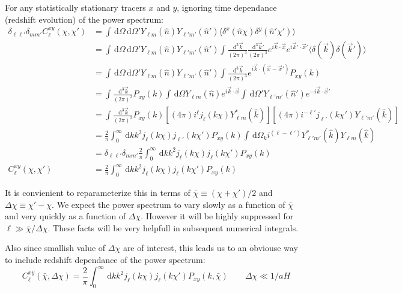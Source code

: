 \documentclass[twocolumn,prl,nofootinbib]{revtex4-1}
\newcommand{\ud}{\,\mathrm{d}}
\begin{document}
\begin{widetext}
For any statistically stationary tracers $x$ and $y$,
ignoring time dependance (redshift evolution)
of the power spectrum:
\begin{align}
    \delta_{\ell\ell'}\delta_{mm'}C^{xy}_\ell(\chi, \chi')
    &= \int\ud\Omega\ud\Omega'Y_{\ell m}(\hat n) Y_{\ell' m'}(\hat n')
        \langle \delta^x(\hat n \chi) \delta^y(\hat n' \chi') \rangle
        \\
    &=
        \int\ud\Omega\ud\Omega'Y_{\ell m}(\hat n) Y_{\ell' m'}(\hat n')
        \int\frac{\ud^3\vec k}{(2 \pi)^3} \frac{\ud^3\vec k'}{(2 \pi)^3}
        e^{i\vec k \cdot \vec x} e^{i\vec k' \cdot \vec x'}
        \langle \delta(\vec k) \delta(\vec k') \rangle
        \\
    &=
        \int\ud\Omega\ud\Omega'Y_{\ell m}(\hat n) Y_{\ell' m'}(\hat n')
        \int\frac{\ud^3\vec k}{(2 \pi)^3} 
        e^{i\vec k \cdot (\vec x - \vec x')} P_{xy}(k)
        \\
    &=
        \int\frac{\ud^3\vec k}{(2 \pi)^3} P_{xy}(k)
        \int\ud\Omega Y_{\ell m}(\hat n)
        e^{i\vec k \cdot \vec x}
        \int\ud\Omega' Y_{\ell' m'}(\hat n')
        e^{-i\vec k \cdot \vec x'}
        \\
    &=
        \int\frac{\ud^3\vec k}{(2 \pi)^3} P_{xy}(k)
        \left[(4 \pi) i^\ell j_\ell(k\chi) Y_{\ell m}^*(\hat k)\right]
        \left[(4 \pi) i^{-\ell'} j_{\ell'}(k\chi') Y_{\ell' m'}(\hat
        k)\right]
        \\
    &=
        \frac{2}{\pi}
        \int_0^\infty\ud k k^2 j_\ell(k\chi) j_{\ell'}(k\chi')P_{xy}(k)
        \int\ud \Omega_k i^{(\ell - \ell')}
        Y_{\ell' m'}^*(\hat k) Y_{\ell m}(\hat k)
        \\
    &= \delta_{\ell\ell'}\delta_{mm'}\frac{2}{\pi}
        \int_0^\infty\ud k k^2  j_\ell(k\chi) j_{\ell}(k\chi')P_{xy}(k)
        \\
    C^{xy}_\ell(\chi,\chi') 
    &= \frac{2}{\pi}
\int_0^\infty\ud k k^2 j_\ell(k\chi) j_{\ell}(k\chi')P_{xy}(k)
\end{align}

It is convienient to reparameterize this in terms of
$\bar\chi \equiv (\chi + \chi') /2$ and $\Delta \chi \equiv \chi' - \chi$.
We expect the power spectrum to vary slowly as a function of $\bar\chi$ and
very quickly as a function of $\Delta\chi$. However it will be highly
suppressed for $\ell \gg \bar\chi/\Delta\chi$. These facts will be very
helpfull in subsequent numerical integrals.

Also since smallish value of $\Delta\chi$ are of interest, this leads us to
an obviouse way to include redshift dependance of the
power spectrum:
\begin{equation}
C^{xy}_\ell(\bar\chi,\Delta\chi) 
    = \frac{2}{\pi}
    \int_0^\infty\ud k k^2
    j_\ell(k\chi) j_{\ell}(k\chi')
    P_{xy}(k,\bar\chi) \qquad \Delta\chi \ll 1/aH
\end{equation}


\end{widetext}
\end{document}
